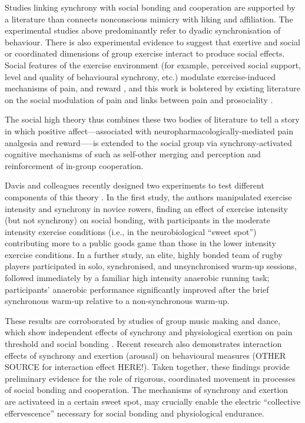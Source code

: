 \begin{CJK}{UTF8}{gbsn}
Studies linking synchrony with social bonding and cooperation are supported by a literature than connects nonconscious mimicry with liking and affiliation\citep{VanBaaren2009}.  The experimental studies above predominantly refer to dyadic synchronisation of behaviour.   There is also experimental evidence to suggest that exertive and social or coordinated dimensions of group exercise interact to produce social effects.  Social features of the exercise environment (for example, perceived social support, level and quality of behavioural synchrony, etc.) modulate exercise-induced mechanisms of pain, and reward \citep{Cohen2009,Sullivan2014,Tarr2015,Davis2015,Weinstein2016}, and this work is bolstered by existing literature on the social modulation of pain \citep{Eisenberger2012a} and links between pain and prosociality \citep{Bastian2014a}.


The social high theory thus combines these two bodies of literature to tell a story in which positive affect---associated with neuropharmacologically-mediated pain analgesia and reward—--is extended to the social group via synchrony-activated cognitive mechanisms of such as self-other merging and perception and reinforcement of in-group cooperation.

Davis and colleagues recently designed two experiments to test different components of this theory \citep{Davis2015}.  In the first study, the authors manipulated exercise intensity and synchrony in novice rowers, finding an effect of exercise intensity (but not synchrony) on social bonding, with participants in the moderate intensity exercise conditions (i.e., in the neurobiological ``sweet spot'') contributing more to a public goods game than those in the lower intensity exercise conditions.  In a further study, an elite, highly bonded team of rugby players participated in solo, synchronised, and unsynchronised warm-up sessions, followed immediately by a familiar high intensity anaerobic running task; participants' anaerobic performance significantly improved after the brief synchronous warm-up relative to a non-synchronous warm-up.

These results are corroborated by studies of group music making and dance, which show independent effects of synchrony and physiological exertion on pain threshold and social bonding \cite{Tarr2015}.  Recent research also demonstrates interaction effects of synchrony and exertion (arousal) on behavioural measures \citep{Jackson2018} (OTHER SOURCE for interaction effect HERE!). Taken together, these findings provide preliminary evidence for the role of rigorous, coordinated movement in processes of social bonding and cooperation.  The mechanisms of synchrony and exertion are activateed in a certain sweet spot, may crucially enable the electric ``collective effervescence'' necessary for social bonding and physiological endurance.


\end{CJK}
